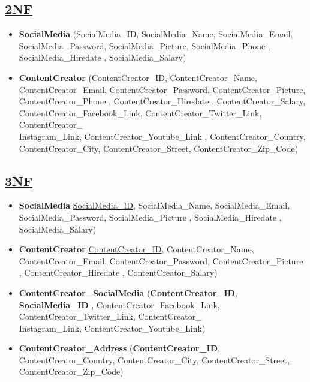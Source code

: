 \subsection*{\underline{2NF}}
\begin{itemize}
    \item \textbf{SocialMedia} (\underline{SocialMedia\_ID}, SocialMedia\_Name, SocialMedia\_Email, SocialMedia\_Password, SocialMedia\_Picture, SocialMedia\_Phone , SocialMedia\_Hiredate , SocialMedia\_Salary)
    \item \textbf{ContentCreator} (\underline{ContentCreator\_ID}, ContentCreator\_Name, ContentCreator\_Email, ContentCreator\_Password, ContentCreator\_Picture, ContentCreator\_Phone , ContentCreator\_Hiredate , ContentCreator\_Salary,
          ContentCreator\_Facebook\_Link, ContentCreator\_Twitter\_Link, ContentCreator\_\\Instagram\_Link, ContentCreator\_Youtube\_Link ,
          ContentCreator\_Country, ContentCreator\_City, ContentCreator\_Street, ContentCreator\_Zip\_Code)
\end{itemize}

\subsection*{\underline{3NF}}

\begin{itemize}
    \item \textbf{SocialMedia} \underline{SocialMedia\_ID}, SocialMedia\_Name, SocialMedia\_Email, SocialMedia\_Password, SocialMedia\_Picture , SocialMedia\_Hiredate , SocialMedia\_Salary)
    \item \textbf{ContentCreator} \underline{ContentCreator\_ID}, ContentCreator\_Name, ContentCreator\_Email, ContentCreator\_Password, ContentCreator\_Picture , ContentCreator\_Hiredate , ContentCreator\_Salary)
    \item \textbf{ContentCreator\_SocialMedia} (\textbf{ContentCreator\_ID}, \textbf{SocialMedia\_ID} , ContentCreator\_Facebook\_Link, ContentCreator\_Twitter\_Link, ContentCreator\_\\Instagram\_Link, ContentCreator\_Youtube\_Link)
    \item \textbf{ContentCreator\_Address} (\textbf{ContentCreator\_ID}, ContentCreator\_Country, ContentCreator\_City, ContentCreator\_Street, ContentCreator\_Zip\_Code)
\end{itemize}


